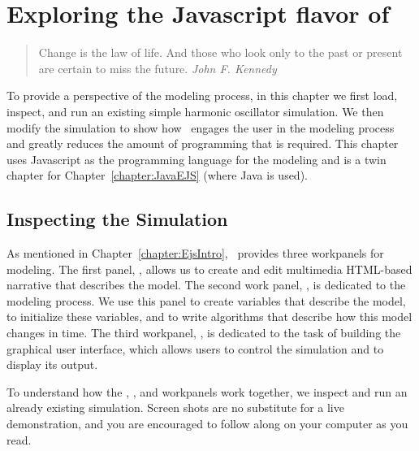 
\chapter{Exploring the Javascript flavor of \Ejs}\label{chapter:JavascriptEJS}

\begin{quote}
Change is the law of life. And those who look only to the past or present are certain to miss the future. {\em John F. Kennedy}
\end{quote}

To  provide a perspective of the modeling process, in this chapter we first load, inspect, and run an existing simple harmonic oscillator simulation. We then modify the simulation to show how \ejs\ engages the user in the modeling process and greatly reduces the amount of
programming that is required. This chapter uses Javascript as the programming language for the modeling and is a twin chapter for Chapter~\ref{chapter:JavaEJS} (where Java is used). 

    \section{Inspecting the Simulation}\label{section:03ExplorationJavascriptInspecting}

As mentioned in Chapter~\ref{chapter:EjsIntro}, \Ejs\ provides three workpanels for modeling. The first panel, , allows us to create and edit multimedia HTML-based narrative that describes the model. 
The second work panel, , is dedicated to the modeling process. We use this panel to create
variables that describe the model, to initialize these variables, and to write algorithms that describe how this model
changes in time. The third workpanel, , is dedicated to the task of building the graphical user interface,
which allows users to control the simulation and to display its output.  

To understand how the , , and  workpanels work together, we inspect and run an
already existing simulation. Screen shots are no substitute for a live demonstration, and you are encouraged to follow along on your computer as you read.

